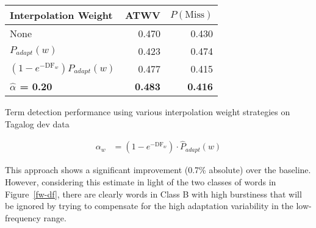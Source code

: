 \documentclass[11pt]{article}
\begin{document}
\begin{table}[t]
\centering
\begin{tabular}{l|r|r} \toprule
\bf Interpolation Weight& \bf ATWV & \bf \bf $P(\mathrm{Miss})$ \\\midrule
None & 0.470 & 0.430 \\
$P_{adapt}(w)$ & 0.423 & 0.474 \\
$(1-e^{-\mathrm{DF}_w})P_{adapt}(w)$ &  0.477 & 0.415 \\
\textbf{$\widehat{\alpha}$ = 0.20} & \bf 0.483 & \bf 0.416 \\
\bottomrule
\end{tabular}
\begin{caption}{Term detection performance using various interpolation weight strategies on Tagalog dev data}
\label{tagalog2}
\end{caption}
\end{table}

\begin{align}
\alpha_w &= (1-e^{-\mathrm{DF}_w}) \cdot \widehat{P}_{adapt}(w)
\label{interp3}
\end{align}

This approach shows a significant improvement (0.7\% absolute) over the baseline.  However, considering this estimate in light of the two classes of words in Figure~\ref{fw-df}, there are clearly words in Class B with high burstiness that will be ignored by trying to compensate for the high adaptation variability in the low-frequency range.  
\end{document}
